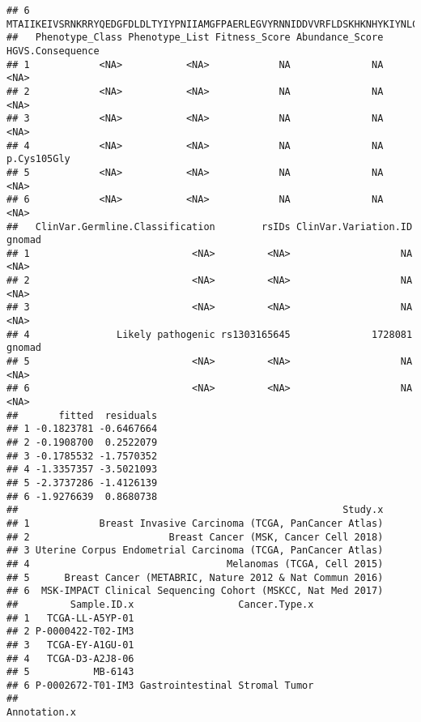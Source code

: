 \documentclass[
]{article}
\begin{document}
\begin{verbatim}
## 6 MTAIIKEIVSRNKRRYQEDGFDLDLTYIYPNIIAMGFPAERLEGVYRNNIDDVVRFLDSKHKNHYKIYNLCAERHYDTAKFNCRVAQYPFEDHNPPQLELIKPFCEDLDQWLSEDDNHVAAIHCKAGKGRTGVMICAYLLHRGKFLKAQEALDFYGEVRTRDKKGVTIPSQRRYVYYYSYLLKNHLDYRPVALLFHKMMFETIPMFSGGTCNPQFVVCQLKVKIYSSNSGPTRREDKFMYFEFPQPLPVCGDIKVEFFHKQNKMLKKDKMFHFWVNTFFIPGPEETSEKVENGSLCDQEIDSICSIERADNDKEYLVLTLTKNDLDKANKDKANRYFSPNFKVKLYFTKTVEEPSNPEASSSTSVTPDVSDNEPDHYRYSDTTDSDPENEPFDEDQHTQITKV
##   Phenotype_Class Phenotype_List Fitness_Score Abundance_Score HGVS.Consequence
## 1            <NA>           <NA>            NA              NA             <NA>
## 2            <NA>           <NA>            NA              NA             <NA>
## 3            <NA>           <NA>            NA              NA             <NA>
## 4            <NA>           <NA>            NA              NA      p.Cys105Gly
## 5            <NA>           <NA>            NA              NA             <NA>
## 6            <NA>           <NA>            NA              NA             <NA>
##   ClinVar.Germline.Classification        rsIDs ClinVar.Variation.ID gnomad
## 1                            <NA>         <NA>                   NA   <NA>
## 2                            <NA>         <NA>                   NA   <NA>
## 3                            <NA>         <NA>                   NA   <NA>
## 4               Likely pathogenic rs1303165645              1728081 gnomad
## 5                            <NA>         <NA>                   NA   <NA>
## 6                            <NA>         <NA>                   NA   <NA>
##       fitted  residuals
## 1 -0.1823781 -0.6467664
## 2 -0.1908700  0.2522079
## 3 -0.1785532 -1.7570352
## 4 -1.3357357 -3.5021093
## 5 -2.3737286 -1.4126139
## 6 -1.9276639  0.8680738
##                                                        Study.x
## 1            Breast Invasive Carcinoma (TCGA, PanCancer Atlas)
## 2                        Breast Cancer (MSK, Cancer Cell 2018)
## 3 Uterine Corpus Endometrial Carcinoma (TCGA, PanCancer Atlas)
## 4                                  Melanomas (TCGA, Cell 2015)
## 5      Breast Cancer (METABRIC, Nature 2012 & Nat Commun 2016)
## 6  MSK-IMPACT Clinical Sequencing Cohort (MSKCC, Nat Med 2017)
##         Sample.ID.x                  Cancer.Type.x
## 1   TCGA-LL-A5YP-01                               
## 2 P-0000422-T02-IM3                               
## 3   TCGA-EY-A1GU-01                               
## 4   TCGA-D3-A2J8-06                               
## 5           MB-6143                               
## 6 P-0002672-T01-IM3 Gastrointestinal Stromal Tumor
##                                                                                                Annotation.x

\end{verbatim}
\end{document}

